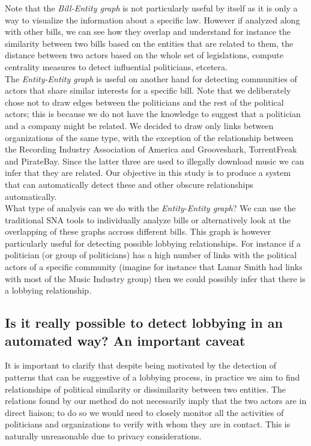 Note that the \emph{Bill-Entity graph} is not particularly useful by itself as it is only a way to visualize the information about a specific law. However if analyzed along with other bills, we can see how they overlap and understand for instance the similarity between two bills based on the entities that are related to them, the distance between two actors based on the whole set of legislations, compute centrality measures to detect influential politicians, etcetera. \\ 

The \emph{Entity-Entity graph} is useful on another hand for detecting communities of actors that share similar interests for a specific bill. Note that we deliberately chose not to draw edges between the politicians and the rest of the political actors; this is because we do not have the knowledge to suggest that a politician and a company might be related. We decided to draw only links between organizations of the same type, with the exception of the relationship between the Recording Industry Association of America and Grooveshark, TorrentFreak and PirateBay. Since the latter three are used to illegally download music we can infer that they are related. Our objective in this study is to produce a system that can automatically detect these and other obscure relationships automatically. \\

What type of analysis can we do with the \emph{Entity-Entity graph}? We can use the traditional SNA tools to individually analyze bills or alternatively look at the overlapping of these graphs accross different bills. This graph is however particularly useful for detecting possible lobbying relationships. For instance if a politician (or group of politicians) has a high number of links with the political actors of a specific community (imagine for instance that Lamar Smith had links with most of the Music Industry group) then we could possibly infer that there is a lobbying relationship.  \\


\subsection{Is it really possible to detect lobbying in an automated way? An important caveat}\label{subsec:really_lobbying} 

It is important to clarify that despite being motivated by the detection of patterns that can be suggestive of a lobbying process, in practice we aim to find relationships of political similarity or dissimilarity between two entities. The relations found by our method do not necessarily imply that the two actors are in direct liaison;  to do so we would need to closely monitor all the activities of politicians and organizations to verify with whom they are in contact. This is naturally unreasonable due to privacy considerations. \\

